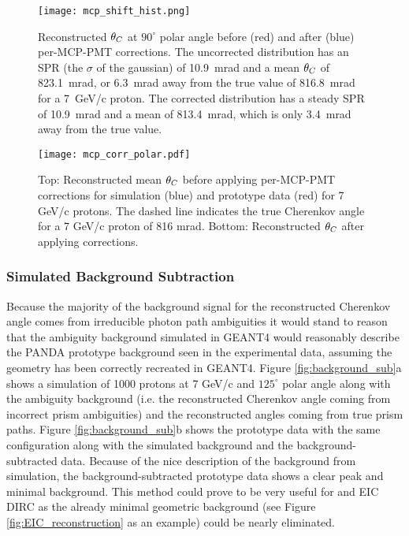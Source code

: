 \begin{figure}[!htb]
	\centering
	\texttt{[image: mcp\_shift\_hist.png]}
	\caption{Reconstructed $\theta_{C}$ at $90^\circ$ polar angle before (red) and after (blue) per-MCP-PMT corrections. The uncorrected distribution has an SPR (the $\sigma$ of the gaussian) of 10.9~mrad and a mean $\theta_{C}$ of 823.1~mrad, or 6.3~mrad away from the true value of 816.8~mrad for a 7~GeV/c proton. The corrected distribution has a steady SPR of 10.9~mrad and a mean of 813.4~mrad, which is only 3.4~mrad away from the true value.}
	\label{fig:mcp_corr_hist}
\end{figure}


\begin{figure}[!htb]
	\centering
	\texttt{[image: mcp\_corr\_polar.pdf]}
	\caption{Top: Reconstructed mean $\theta_{C}$ before applying per-MCP-PMT corrections for simulation (blue) and prototype data (red) for 7 GeV/c protons. The dashed line indicates the true Cherenkov angle for a 7 GeV/c proton of 816 mrad. Bottom: Reconstructed $\theta_{C}$ after applying corrections.}
	\label{fig:mcp_corr_polar}
\end{figure}


\subsubsection{Simulated Background Subtraction}
Because the majority of the background signal for the reconstructed Cherenkov angle comes from irreducible photon path ambiguities it would stand to reason that the ambiguity background simulated in GEANT4 would reasonably describe the PANDA prototype background seen in the experimental data, assuming the geometry has been correctly recreated in GEANT4. Figure \ref{fig:background_sub}a shows a simulation of 1000 protons at 7 GeV/c and $125^\circ$ polar angle along with the ambiguity background (i.e. the reconstructed Cherenkov angle coming from incorrect prism ambiguities) and the reconstructed angles coming from true prism paths. Figure \ref{fig:background_sub}b shows the prototype data with the same configuration along with the simulated background and the background-subtracted data. Because of the nice description of the background from simulation, the background-subtracted prototype data shows a clear peak and minimal background. This method could prove to be very useful for and EIC DIRC as the already minimal geometric background (see Figure \ref{fig:EIC_reconstruction} as an example) could be nearly eliminated.

